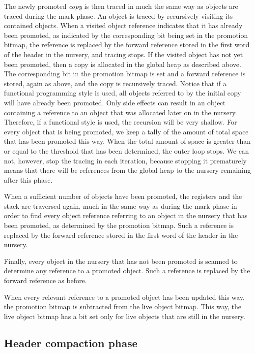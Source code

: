 The newly promoted \emph{copy} is then traced in much the same way as
objects are traced during the mark phase.  An object is traced by
recursively visiting its contained objects.  When a visited object
reference indicates that it has already been promoted, as indicated by
the corresponding bit being set in the promotion bitmap, the reference
is replaced by the forward reference stored in the first word of the
header in the nursery, and tracing stops.  If the visited object has
not yet been promoted, then a copy is allocated in the global heap as
described above.  The corresponding bit in the promotion bitmap is set
and a forward reference is stored, again as above, and the copy is
recursively traced.  Notice that if a functional programming style is
used, all objects referred to by the initial copy will have already
been promoted.  Only side effects can result in an object containing a
reference to an object that was allocated later on in the nursery.
Therefore, if a functional style is used, the recursion will be very
shallow.  For every object that is being promoted, we keep a tally of
the amount of total space that has been promoted this way.  When the
total amount of space is greater than or equal to the threshold that
has been determined, the outer loop stops.  We can not, however, stop
the tracing in each iteration, because stopping it prematurely means
that there will be references from the global heap to the nursery
remaining after this phase.

When a sufficient number of objects have been promoted, the registers
and the stack are traversed again, much in the same way as during the
mark phase in order to find every object reference referring to an
object in the nursery that has been promoted, as determined by the
promotion bitmap.  Such a reference is replaced by the forward
reference stored in the first word of the header in the nursery.

Finally, every object in the nursery that has not been promoted is
scanned to determine any reference to a promoted object.  Such a
reference is replaced by the forward reference as before.

When every relevant reference to a promoted object has been updated
this way, the promotion bitmap is subtracted from the live object
bitmap.  This way, the live object bitmap has a bit set only for live
objects that are still in the nursery.

\subsection{Header compaction phase}


